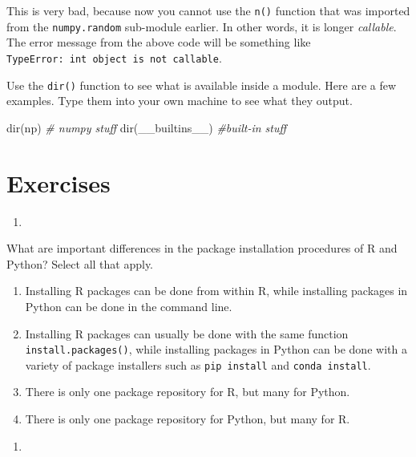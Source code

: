 \documentclass[
  12pt,
  krantz2]{krantz}
\makeatletter
\newenvironment{Shaded}{\begin{snugshade}}{\end{snugshade}}
\newcommand{\BuiltInTok}[1]{#1}
\newcommand{\CommentTok}[1]{\textcolor[rgb]{0.37,0.37,0.37}{\textit{#1}}}
\newcommand{\NormalTok}[1]{#1}
\providecommand{\tightlist}{%
  \setlength{\itemsep}{0pt}\setlength{\parskip}{0pt}}
\newenvironment{kframe}{%
\medskip{}
\setlength{\fboxsep}{.8em}
 \def\at@end@of@kframe{}%
 \ifinner\ifhmode%
  \def\at@end@of@kframe{\end{minipage}}%
  \begin{minipage}{\columnwidth}%
 \fi\fi%
 \def\FrameCommand##1{\hskip\@totalleftmargin \hskip-\fboxsep
 \colorbox{shadecolor}{##1}\hskip-\fboxsep
     \hskip-\linewidth \hskip-\@totalleftmargin \hskip\columnwidth}%
 \MakeFramed {\advance\hsize-\width
   \@totalleftmargin\z@ \linewidth\hsize
   \@setminipage}}%
 {\par\unskip\endMakeFramed%
 \at@end@of@kframe}
\renewenvironment{Shaded}{\begin{kframe}}{\end{kframe}}
\makeatother
\begin{document}
This is very bad, because now you cannot use the \texttt{n()} function that was imported from the \texttt{numpy.random} sub-module earlier. In other words, it is longer \emph{callable}. The error message from the above code will be something like \texttt{TypeError:\ \textquotesingle{}int\textquotesingle{}\ object\ is\ not\ callable}.

Use the \texttt{dir()} function to see what is available inside a module. Here are a few examples. Type them into your own machine to see what they output.

\begin{Shaded}
\begin{Highlighting}[]
\BuiltInTok{dir}\NormalTok{(np) }\CommentTok{\# numpy stuff}
\BuiltInTok{dir}\NormalTok{(\_\_builtins\_\_) }\CommentTok{\#built{-}in stuff}
\end{Highlighting}
\end{Shaded}

\hypertarget{exercises-8}{%
\section{Exercises}\label{exercises-8}}

\begin{enumerate}
\def\labelenumi{\arabic{enumi}.}
\tightlist
\item
\end{enumerate}

What are important differences in the package installation procedures of R and Python? Select all that apply.

\begin{enumerate}
\def\labelenumi{\alph{enumi})}
\tightlist
\item
  Installing R packages can be done from within R, while installing packages in Python can be done in the command line.
\item
  Installing R packages can usually be done with the same function \texttt{install.packages()}, while installing packages in Python can be done with a variety of package installers such as \texttt{pip\ install} and \texttt{conda\ install}.
\item
  There is only one package repository for R, but many for Python.
\item
  There is only one package repository for Python, but many for R.
\end{enumerate}

\begin{enumerate}
\def\labelenumi{\arabic{enumi}.}
\setcounter{enumi}{1}
\tightlist
\item
\end{enumerate}
\end{document}
